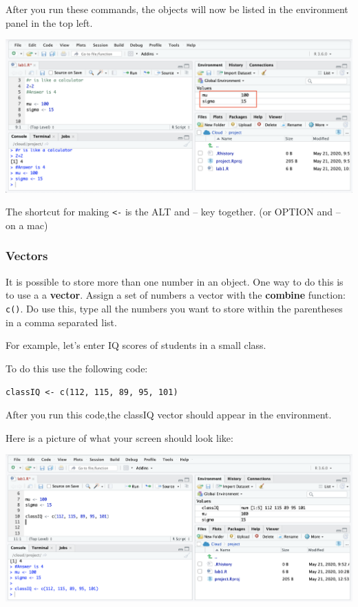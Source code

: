 \documentclass[
]{book}
\begin{document}
After you run these commands, the objects will now be listed in the environment panel in the top left.

\includegraphics{img/object.png}

The shortcut for making \texttt{\textless{}-} is the ALT and -- key together. (or OPTION and -- on a mac)

\hypertarget{vectors}{%
\subsubsection{Vectors}\label{vectors}}

It is possible to store more than one number in an object. One way to do this is to use a a \textbf{vector}. Assign a set of numbers a vector with the \textbf{combine} function: \texttt{c()}. Do use this, type all the numbers you want to store within the parentheses in a comma separated list.

For example, let's enter IQ scores of students in a small class.

To do this use the following code:

\texttt{classIQ\ \textless{}-\ c(112,\ 115,\ 89,\ 95,\ 101)}

After you run this code,the classIQ vector should appear in the environment.

Here is a picture of what your screen should look like:

\includegraphics{img/vector.png}
\end{document}
